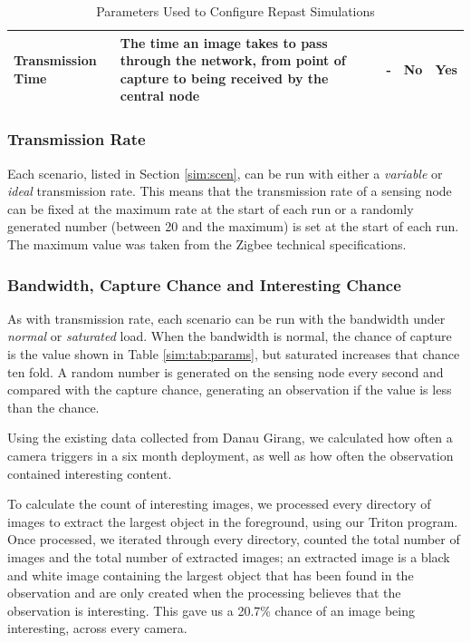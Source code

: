 \begin{landscape}
\begin{table}
\begin{tabularx}{\textwidth}{|p{4cm}|p{10cm}|p{3cm}|p{2cm}|p{2cm}|}
	Transmission Time                       & The time an image takes to pass through the network, from point of capture to being received by the central node            & -                   & No                 & Yes      \\
	\bottomrule         
	\end{tabularx}
	\caption{Parameters Used to Configure Repast Simulations}
	\end{table}
    \label{sim:tab:params}
	\end{landscape}

	\subsubsection{Transmission Rate}
	Each scenario, listed in Section \ref{sim:scen}, can be run with either a \textit{variable} or \textit{ideal} transmission rate. This means that the transmission rate of a sensing node can be fixed at the maximum rate at the start of each run or a randomly generated number (between 20 and the maximum) is set at the start of each run. The maximum value was taken from the Zigbee technical specifications.


	\subsubsection{Bandwidth, Capture Chance and Interesting Chance}
	As with transmission rate, each scenario can be run with the bandwidth under \textit{normal} or \textit{saturated} load. When the bandwidth is normal, the chance of capture is the value shown in Table \ref{sim:tab:params}, but saturated increases that chance ten fold. A random number is generated on the sensing node every second and compared with the capture chance, generating an observation if the value is less than the chance. 

	Using the existing data collected from Danau Girang, we calculated how often a camera triggers in a six month deployment, as well as how often the observation contained interesting content. 
	
	To calculate the count of interesting images, we processed every directory of images to extract the largest object in the foreground, using our Triton program. Once processed, we iterated through every directory, counted the total number of images and the total number of extracted images; an extracted image is a black and white image containing the largest object that has been found in the observation and are only created when the processing believes that the observation is interesting. This gave us a 20.7\% chance of an image being interesting, across every camera.
	
